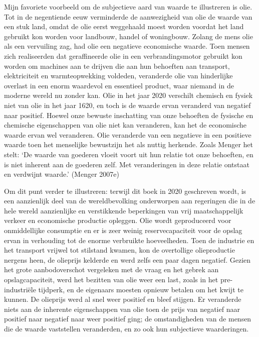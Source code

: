 \documentclass[
  a5paper,
  smalldemyvopaper,11pt,twoside,onecolumn,openright,extrafontsizes,
hidelinks]{memoir}
\begin{document}
Mijn favoriete voorbeeld om de subjectieve aard van waarde te
illustreren is olie. Tot in de negentiende eeuw verminderde de
aanwezigheid van olie de waarde van een stuk land, omdat de olie eerst
weggehaald moest worden voordat het land gebruikt kon worden voor
landbouw, handel of woningbouw. Zolang de mens olie als een vervuiling
zag, had olie een negatieve economische waarde. Toen mensen zich
realiseerden dat geraffineerde olie in een verbrandingsmotor gebruikt
kon worden om machines aan te drijven die aan hun behoeften aan
transport, elektriciteit en warmteopwekking voldeden, veranderde olie
van hinderlijke overlast in een enorm waardevol en essentieel product,
waar niemand in de moderne wereld nu zonder kan. Olie in het jaar 2020
verschilt chemisch en fysiek niet van olie in het jaar 1620, en toch is
de waarde ervan veranderd van negatief naar positief. Hoewel onze
bewuste inschatting van onze behoeften de fysische en chemische
eigenschappen van olie niet kan veranderen, kan het de economische
waarde ervan wel veranderen. Olie veranderde van een negatieve in een
positieve waarde toen het menselijke bewustzijn het als nuttig herkende.
Zoals Menger het stelt: `De waarde van goederen vloeit voort uit hun
relatie tot onze behoeften, en is niet inherent aan de goederen zelf.
Met veranderingen in deze relatie ontstaat en verdwijnt waarde.' (Menger
2007e)

Om dit punt verder te illustreren: terwijl dit boek in 2020 geschreven
wordt, is een aanzienlijk deel van de wereldbevolking onderworpen aan
regeringen die in de hele wereld aanzienlijke en verstikkende
beperkingen van vrij maatschappelijk verkeer en economische productie
opleggen. Olie wordt geproduceerd voor onmiddellijke consumptie en er is
zeer weinig reservecapaciteit voor de opslag ervan in verhouding tot de
enorme verbruikte hoeveelheden. Toen de industrie en het transport
vrijwel tot stilstand kwamen, kon de overtollige olieproductie nergens
heen, de olieprijs kelderde en werd zelfs een paar dagen negatief.
Gezien het grote aanbodoverschot vergeleken met de vraag en het gebrek
aan opslagcapaciteit, werd het bezitten van olie weer een last, zoals in
het pre-industriële tijdperk, en de eigenaars moesten opnieuw betalen om
het kwijt te kunnen. De olieprijs werd al snel weer positief en bleef
stijgen. Er veranderde niets aan de inherente eigenschappen van olie
toen de prijs van negatief naar positief naar negatief naar weer
positief ging; de omstandigheden van de mensen die de waarde vaststellen
veranderden, en zo ook hun subjectieve waarderingen.
\end{document}
